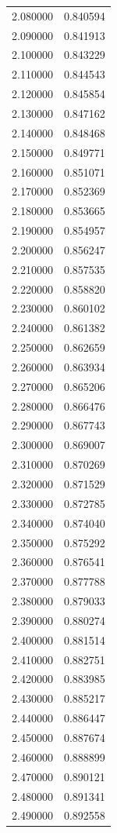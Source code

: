 \begin{tabular}{rr}
2.080000 & 0.840594 \\
2.090000 & 0.841913 \\
2.100000 & 0.843229 \\
2.110000 & 0.844543 \\
2.120000 & 0.845854 \\
2.130000 & 0.847162 \\
2.140000 & 0.848468 \\
2.150000 & 0.849771 \\
2.160000 & 0.851071 \\
2.170000 & 0.852369 \\
2.180000 & 0.853665 \\
2.190000 & 0.854957 \\
2.200000 & 0.856247 \\
2.210000 & 0.857535 \\
2.220000 & 0.858820 \\
2.230000 & 0.860102 \\
2.240000 & 0.861382 \\
2.250000 & 0.862659 \\
2.260000 & 0.863934 \\
2.270000 & 0.865206 \\
2.280000 & 0.866476 \\
2.290000 & 0.867743 \\
2.300000 & 0.869007 \\
2.310000 & 0.870269 \\
2.320000 & 0.871529 \\
2.330000 & 0.872785 \\
2.340000 & 0.874040 \\
2.350000 & 0.875292 \\
2.360000 & 0.876541 \\
2.370000 & 0.877788 \\
2.380000 & 0.879033 \\
2.390000 & 0.880274 \\
2.400000 & 0.881514 \\
2.410000 & 0.882751 \\
2.420000 & 0.883985 \\
2.430000 & 0.885217 \\
2.440000 & 0.886447 \\
2.450000 & 0.887674 \\
2.460000 & 0.888899 \\
2.470000 & 0.890121 \\
2.480000 & 0.891341 \\
2.490000 & 0.892558 \\

\end{tabular}
